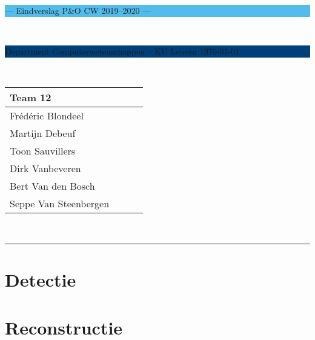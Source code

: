 \documentclass[a4paper,11pt]{article}
\begin{document}
\noindent
\colorbox[HTML]{52BDEC}{\bfseries\parbox{\textwidth}{\centering\large
  --- Eindverslag P\&O CW 2019--2020 --- 
}}
\\[-1mm]
\colorbox[HTML]{00407A}{\bfseries\color{white}\parbox{\textwidth}{
  Department Computerwetenschappen -- KU Leuven
  \hfill
  \today
}}
\\

\smallskip

\noindent

\begin{tabular}{*4l}
\toprule
\multicolumn{2}{l}{\large\textbf{Team 12}} \\
\midrule
Frédéric Blondeel &\\
Martijn Debeuf &\\
Toon Sauvillers &\\ %
Dirk Vanbeveren  &\\
Bert Van den Bosch & \\
Seppe Van Steenbergen &\\


\bottomrule
\hline
\end{tabular}\\

\noindent
{\color[HTML]{52BDEC} \rule{\linewidth}{1mm} }
\tableofcontents
\newpage

\section{Detectie}\label{sec:detectie}


\section{Reconstructie}\label{sec:reconstructie}

	






\newpage



\end{document}
